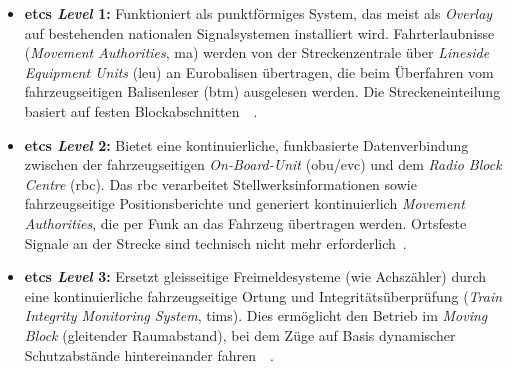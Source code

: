 \documentclass[runningheads]{res/llncs}
\begin{document}
\begin{itemize}


    \item \textbf{\gls{etcs} \textit{Level} 1:} Funktioniert als punktförmiges System, das meist als \textit{Overlay} auf bestehenden nationalen Signalsystemen installiert wird. Fahrterlaubnisse (\textit{Movement Authorities}, \gls{ma}) werden von der Streckenzentrale über \textit{Lineside Equipment Units} (\gls{leu}) an Eurobalisen übertragen, die beim Überfahren vom fahrzeugseitigen Balisenleser (\gls{btm}) ausgelesen werden. Die Streckeneinteilung basiert auf festen Blockabschnitten~\parencite[S. 50, 71]{trinckaufETCS2024}~\parencite[S. 744]{chothiaAttack2017}.
    
    
    \item \textbf{\gls{etcs} \textit{Level} 2:} Bietet eine kontinuierliche, funkbasierte Datenverbindung zwischen der fahrzeugseitigen \textit{On-Board-Unit} (\gls{obu}/\gls{evc}) und dem \textit{Radio Block Centre} (\gls{rbc}). Das \gls{rbc} verarbeitet Stellwerksinformationen sowie fahrzeugseitige Positionsberichte und generiert kontinuierlich \textit{Movement Authorities}, die per Funk an das Fahrzeug übertragen werden. Ortsfeste Signale an der Strecke sind technisch nicht mehr erforderlich~\parencite[S. 71, 89--90]{trinckaufETCS2024}.
    

    \item \textbf{\gls{etcs} \textit{Level} 3:} Ersetzt gleisseitige Freimeldesysteme (wie Achszähler) durch eine kontinuierliche fahrzeugseitige Ortung und Integritätsüberprüfung (\textit{Train Integrity Monitoring System}, \gls{tims}). Dies ermöglicht den Betrieb im \textit{Moving Block} (gleitender Raumabstand), bei dem Züge auf Basis dynamischer Schutzabstände hintereinander fahren~\parencite[S. 471--472]{trinckaufETCS2024}~\parencite[S. 744]{chothiaAttack2017}.
\end{itemize}
\end{document}
